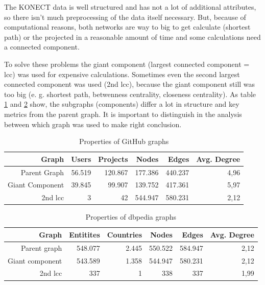 \documentclass[
a4paper,     %
12pt         %
]{scrartcl}  %
\begin{document}
The KONECT data is well structured and has not a lot of additional attributes, so there isn't much preprocessing of the data itself necessary. 
But, because of computational reasons, both networks are way to big to get calculate (shortest path) or the projected in a reasonable amount of time and some calculations need a connected component.

To solve these problems the giant component (largest connected component = lcc) was used for expensive calculations. Sometimes even the second largest connected component was used (2nd lcc), because the giant component still was too big (e. g. shortest path, betwenness centrality, closeness centrality). As table \ref{tab:github-graphs} and \ref{tab:dbpedia-graphs} show, the subgraphs (components) differ a lot in structure and key metrics from the parent graph. It is important to distinguish in the analysis between which graph was used to make right conclusion. 

\begin{table}[h!]
  \begin{center}
    \begin{tabular}{rrrrrr}
      \toprule
      Graph & Users & Projects & Nodes & Edges & Avg. Degree \\
      \midrule
             Parent Graph & 56.519 & 120.867 & 177.386 & 440.237 & 4,96 \\
             Giant Component & 39.845 & 99.907 & 139.752 & 417.361 & 5,97 \\
             2nd lcc & 3 & 42 & 544.947 & 580.231 & 2,12 \\
    \end{tabular}
  \end{center}
  \caption{Properties of GitHub graphs}
  \label{tab:github-graphs}
\end{table}

\begin{table}[h!]
  \begin{center}
    \begin{tabular}{rrrrrr}
      \toprule
      Graph & Entitites & Countries & Nodes & Edges & Avg. Degree \\
      \midrule
             Parent graph & 548.077 & 2.445 & 550.522 & 584.947 & 2,12 \\
             Giant component & 543.589 & 1.358 & 544.947 & 580.231 & 2,12 \\
             2nd lcc & 337 & 1 & 338 & 337 & 1,99 \\
    \end{tabular}
  \end{center}
  \caption{Properties of dbpedia graphs}
  \label{tab:dbpedia-graphs}
\end{table}
\end{document}
